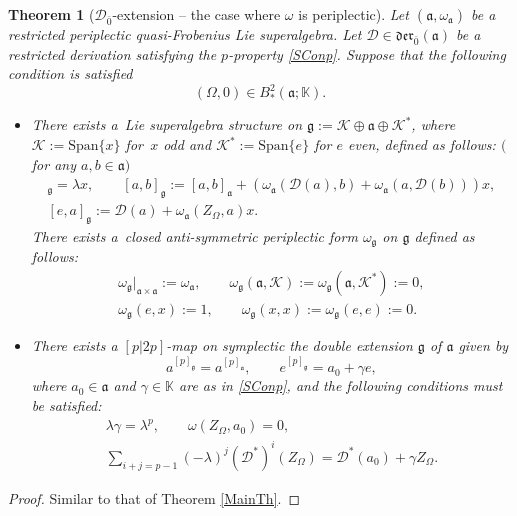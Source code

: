 \documentclass[pdftex]{sigma}
\numberwithin{equation}{section}
\newtheorem{Theorem}{Theorem}[section]
\begin{document}
\begin{Theorem}[${\mathscr D}_{\bar 0}$-extension -- the case where $\omega$ is periplectic]\label{MainThOE} Let $(\mathfrak{a}, \omega_\mathfrak{a})$ be a restricted periplectic quasi-Frobenius Lie superalgebra. Let ${\mathscr D}\in \mathfrak{der}_{\bar 0}(\mathfrak{a})$ be a restricted derivation satisfying the $p$-property \eqref{SConp}. Suppose that the following condition is satisfied
\[
(\Omega, 0) \in B^2_*(\mathfrak{a}; \mathbb{K}).
\]
\begin{itemize}\itemsep=0pt
\item[$(i)$] There exists a~Lie superalgebra structure on $\mathfrak{g}:=\mathscr{K} \oplus \mathfrak{a} \oplus \mathscr{K} ^*$, where $\mathscr{K} :=\mathrm{Span}\{x\}$ for~$x$ odd and $\mathscr{K}^* :=\mathrm{Span}\{e\}$ for $e$ even, defined as follows: $($for any $a, b\in \mathfrak{a})$
\begin{gather*}
[x ,e]_\mathfrak{g}=\lambda x, \qquad [a,b]_\mathfrak{g} := [a,b]_\mathfrak{a} + (\omega_\mathfrak{a}( {\mathscr D}(a), b) + \omega_\mathfrak{a}(a, {\mathscr D}(b)))x, \\
 [e,a]_\mathfrak{g} := {\mathscr D}(a)+ \omega_\mathfrak{a}(Z_\Omega,a)x.
\end{gather*}
There exists a~closed anti-symmetric periplectic form $\omega_\mathfrak{g}$ on $\mathfrak{g}$ defined as follows:
\begin{gather*}
{\omega_\mathfrak{g}}\vert_{\mathfrak{a} \times \mathfrak{a}}:= \omega_\mathfrak{a}, \qquad \omega_\mathfrak{g}(\mathfrak{a},\mathscr{K} ):=\omega_\mathfrak{g}(\mathfrak{a},\mathscr{K} ^*):=0, \\ \omega_\mathfrak{g}(e,x):=1, \qquad
\omega_\mathfrak{g}(x,x):=\omega_\mathfrak{g}(e,e) :=0.
\end{gather*}
\item[$(ii)$] There exists a $[p|2p]$-map on symplectic the double extension $\mathfrak{g}$ of $\mathfrak{a}$ given by
\[
a^{[p]_\mathfrak{g}} = a^{[p]_\mathfrak{a}}, \qquad
e^{[p]_\mathfrak{g}} = a_0+\gamma e,
\]
where $a_0\in \mathfrak{a}$ and $\gamma \in \mathbb{K}$ are as in \eqref{SConp}, and the following conditions must be satisfied:
\begin{gather*}
\lambda \gamma = \lambda^p,\qquad \omega(Z_\Omega, a_0) = 0,\\
 \sum_{i+j=p-1}(-\lambda)^j({\mathscr D}^*)^{i} (Z_\Omega) = {\mathscr D}^*(a_0) + \gamma Z_\Omega.
\end{gather*}
\end{itemize}
\end{Theorem}
\begin{proof}
Similar to that of Theorem \ref{MainTh}.
\end{proof}
\end{document}

